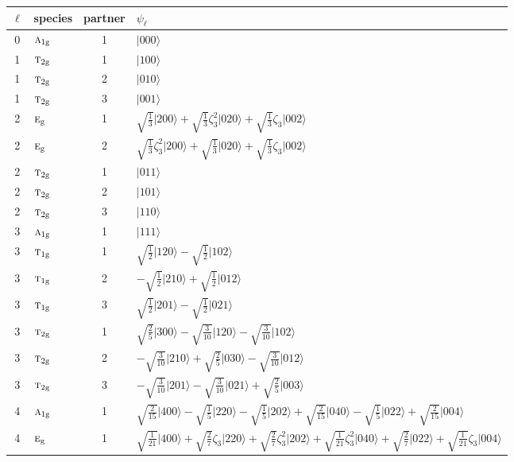 \documentclass[11pt]{article}
\newcommand{\irr}[1]{\text{\normalfont\scshape #1}}
\newcommand{\ptag}[1]{\mathrm{#1}}
\newcommand{\rootunity}[1]{\zeta_{#1}}
\newcommand{\occ}[1]{\lvert #1\rangle}
\begin{document}
\begin{longtable}{c l c p{}}\hline $\ell$ & species & partner & $\psi_\ell$\\ \hline\endhead
0 & $\irr{a}_{1\ptag{g}}$ & 1 & $\occ{000}$\\
\hline
1 & $\irr{t}_{2\ptag{g}}$ & 1 & $\occ{100}$\\
1 & $\irr{t}_{2\ptag{g}}$ & 2 & $\occ{010}$\\
1 & $\irr{t}_{2\ptag{g}}$ & 3 & $\occ{001}$\\
\hline
2 & $\irr{e}_{\ptag{g}}$ & 1 & $\sqrt{\tfrac{1}{3}}\occ{200}+\sqrt{\tfrac{1}{3}}\rootunity{3}^{2}\occ{020}+\sqrt{\tfrac{1}{3}}\rootunity{3}\occ{002}$\\
2 & $\irr{e}_{\ptag{g}}$ & 2 & $\sqrt{\tfrac{1}{3}}\rootunity{3}^{2}\occ{200}+\sqrt{\tfrac{1}{3}}\occ{020}+\sqrt{\tfrac{1}{3}}\rootunity{3}\occ{002}$\\
2 & $\irr{t}_{2\ptag{g}}$ & 1 & $\occ{011}$\\
2 & $\irr{t}_{2\ptag{g}}$ & 2 & $\occ{101}$\\
2 & $\irr{t}_{2\ptag{g}}$ & 3 & $\occ{110}$\\
\hline
3 & $\irr{a}_{1\ptag{g}}$ & 1 & $\occ{111}$\\
3 & $\irr{t}_{1\ptag{g}}$ & 1 & $\sqrt{\tfrac{1}{2}}\occ{120}-\sqrt{\tfrac{1}{2}}\occ{102}$\\
3 & $\irr{t}_{1\ptag{g}}$ & 2 & $-\sqrt{\tfrac{1}{2}}\occ{210}+\sqrt{\tfrac{1}{2}}\occ{012}$\\
3 & $\irr{t}_{1\ptag{g}}$ & 3 & $\sqrt{\tfrac{1}{2}}\occ{201}-\sqrt{\tfrac{1}{2}}\occ{021}$\\
3 & $\irr{t}_{2\ptag{g}}$ & 1 & $\sqrt{\tfrac{2}{5}}\occ{300}-\sqrt{\tfrac{3}{10}}\occ{120}-\sqrt{\tfrac{3}{10}}\occ{102}$\\
3 & $\irr{t}_{2\ptag{g}}$ & 2 & $-\sqrt{\tfrac{3}{10}}\occ{210}+\sqrt{\tfrac{2}{5}}\occ{030}-\sqrt{\tfrac{3}{10}}\occ{012}$\\
3 & $\irr{t}_{2\ptag{g}}$ & 3 & $-\sqrt{\tfrac{3}{10}}\occ{201}-\sqrt{\tfrac{3}{10}}\occ{021}+\sqrt{\tfrac{2}{5}}\occ{003}$\\
\hline
4 & $\irr{a}_{1\ptag{g}}$ & 1 & $\sqrt{\tfrac{2}{15}}\occ{400}-\sqrt{\tfrac{1}{5}}\occ{220}-\sqrt{\tfrac{1}{5}}\occ{202}+\sqrt{\tfrac{2}{15}}\occ{040}-\sqrt{\tfrac{1}{5}}\occ{022}+\sqrt{\tfrac{2}{15}}\occ{004}$\\
4 & $\irr{e}_{\ptag{g}}$ & 1 & $\sqrt{\tfrac{1}{21}}\occ{400}+\sqrt{\tfrac{2}{7}}\rootunity{3}\occ{220}+\sqrt{\tfrac{2}{7}}\rootunity{3}^{2}\occ{202}+\sqrt{\tfrac{1}{21}}\rootunity{3}^{2}\occ{040}+\sqrt{\tfrac{2}{7}}\occ{022}+\sqrt{\tfrac{1}{21}}\rootunity{3}\occ{004}$\\

\end{longtable}
\end{document}

